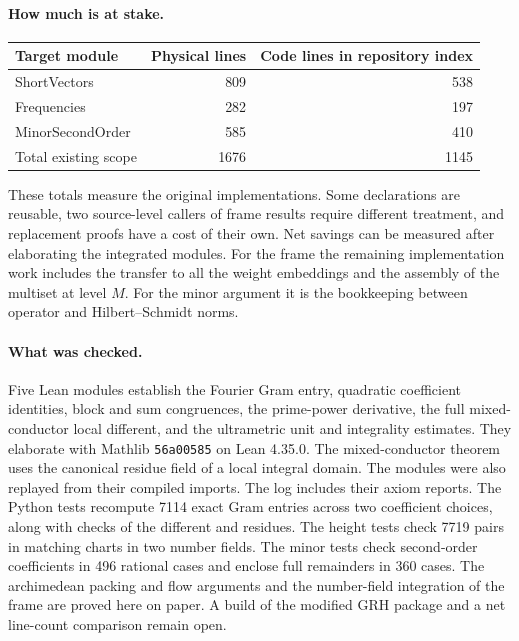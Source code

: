 \documentclass[11pt,letterpaper]{article}
\begin{document}
\paragraph{How much is at stake.}
\begin{center}
\begin{tabular}{@{}lrr@{}}\toprule
\textbf{Target module} & \textbf{Physical lines} & \textbf{Code lines in repository index}\\\midrule
ShortVectors & 809 & 538\\
Frequencies & 282 & 197\\
MinorSecondOrder & 585 & 410\\\midrule
Total existing scope & 1676 & 1145\\\bottomrule
\end{tabular}
\end{center}
These totals measure the original implementations. Some declarations are reusable, two source-level callers of frame results require different treatment, and replacement proofs have a cost of their own. Net savings can be measured after elaborating the integrated modules. For the frame the remaining implementation work includes the transfer to all the weight embeddings and the assembly of the multiset at level $M$. For the minor argument it is the bookkeeping between operator and Hilbert--Schmidt norms.

\paragraph{What was checked.}
Five Lean modules establish the Fourier Gram entry, quadratic coefficient identities, block and sum congruences, the prime-power derivative, the full mixed-conductor local different, and the ultrametric unit and integrality estimates. They elaborate with Mathlib \texttt{56a00585} on Lean 4.35.0. The mixed-conductor theorem uses the canonical residue field of a local integral domain. The modules were also replayed from their compiled imports. The log includes their axiom reports. The Python tests recompute 7114 exact Gram entries across two coefficient choices, along with checks of the different and residues. The height tests check 7719 pairs in matching charts in two number fields. The minor tests check second-order coefficients in 496 rational cases and enclose full remainders in 360 cases. The archimedean packing and flow arguments and the number-field integration of the frame are proved here on paper. A build of the modified GRH package and a net line-count comparison remain open.
\end{document}
